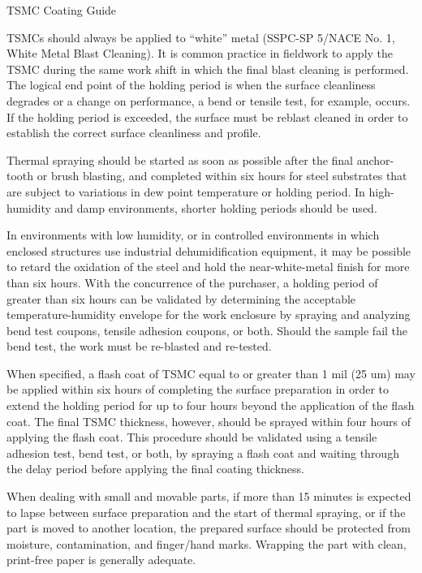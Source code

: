 \begin{table}
  \caption{TSMC Coating Guide}
  \label{tab:label}
\end{table}

TSMCs should always be applied to “white” metal (SSPC-SP 5/NACE No. 1, White Metal Blast Cleaning). It is
common practice in fieldwork to apply the TSMC during the same work shift in which the final blast cleaning is
performed. The logical end point of the holding period is when the surface cleanliness degrades or a change on
performance, a bend or tensile test, for example, occurs. If the holding period is exceeded, the surface must be reblast
cleaned in order to establish the correct surface cleanliness and profile.

Thermal spraying should be started as soon as possible after the final anchor-tooth or brush blasting, and
completed within six hours for steel substrates that are subject to variations in dew point temperature or holding
period. In high-humidity and damp environments, shorter holding periods should be used.

In environments with low humidity, or in controlled environments in which enclosed structures use industrial
dehumidification equipment, it may be possible to retard the oxidation of the steel and hold the near-white-metal
finish for more than six hours. With the concurrence of the purchaser, a holding period of greater than six hours can
be validated by determining the acceptable temperature-humidity envelope for the work enclosure by spraying and
analyzing bend test coupons, tensile adhesion coupons, or both. Should the sample fail the bend test, the work must
be re-blasted and re-tested.

When specified, a flash coat of TSMC equal to or greater than 1 mil (25 um) may be applied within six hours of
completing the surface preparation in order to extend the holding period for up to four hours beyond the application
of the flash coat. The final TSMC thickness, however, should be sprayed within four hours of applying the flash
coat. This procedure should be validated using a tensile adhesion test, bend test, or both, by spraying a flash coat and
waiting through the delay period before applying the final coating thickness.

When dealing with small and movable parts, if more than 15 minutes is expected to lapse between surface
preparation and the start of thermal spraying, or if the part is moved to another location, the prepared surface should
be protected from moisture, contamination, and finger/hand marks. Wrapping the part with clean, print-free paper is
generally adequate.

